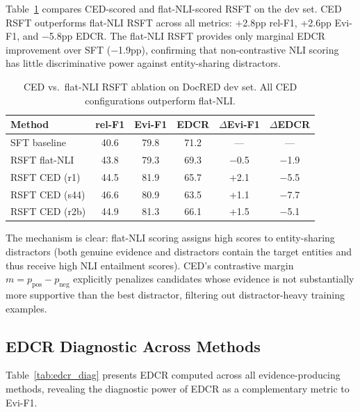 \documentclass[11pt,a4paper]{article}
\begin{document}
Table~\ref{tab:ced_vs_flatnli} compares CED-scored and flat-NLI-scored RSFT on the dev set. CED RSFT outperforms flat-NLI RSFT across all metrics: +2.8pp rel-F1, +2.6pp Evi-F1, and $-$5.8pp EDCR. The flat-NLI RSFT provides only marginal EDCR improvement over SFT ($-$1.9pp), confirming that non-contrastive NLI scoring has little discriminative power against entity-sharing distractors.

\begin{table}[t]
\centering
\caption{CED vs.\ flat-NLI RSFT ablation on DocRED dev set. All CED configurations outperform flat-NLI.}
\label{tab:ced_vs_flatnli}
\begin{tabular}{lccccc}
\toprule
\textbf{Method} & \textbf{rel-F1} & \textbf{Evi-F1} & \textbf{EDCR} & $\Delta$\textbf{Evi-F1} & $\Delta$\textbf{EDCR} \\
\midrule
SFT baseline & 40.6 & 79.8 & 71.2 & --- & --- \\
RSFT flat-NLI & 43.8 & 79.3 & 69.3 & $-$0.5 & $-$1.9 \\
RSFT CED (r1) & 44.5 & 81.9 & 65.7 & +2.1 & $-$5.5 \\
RSFT CED (s44) & 46.6 & 80.9 & 63.5 & +1.1 & $-$7.7 \\
RSFT CED (r2b) & 44.9 & 81.3 & 66.1 & +1.5 & $-$5.1 \\
\bottomrule
\end{tabular}
\end{table}

The mechanism is clear: flat-NLI scoring assigns high scores to entity-sharing distractors (both genuine evidence and distractors contain the target entities and thus receive high NLI entailment scores). CED's contrastive margin $m = p_\text{pos} - p_\text{neg}$ explicitly penalizes candidates whose evidence is not substantially more supportive than the best distractor, filtering out distractor-heavy training examples.

\subsection{EDCR Diagnostic Across Methods}

Table~\ref{tab:edcr_diag} presents EDCR computed across all evidence-producing methods, revealing the diagnostic power of EDCR as a complementary metric to Evi-F1.
\end{document}
